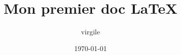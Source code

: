 \documentclass[a4paper,12pt]{article}
\begin{document}
\title{Mon premier doc \LaTeX}
\author{virgile}
\date{\today}

\maketitle
\blindtext \\

\blindtext
\end{document}
